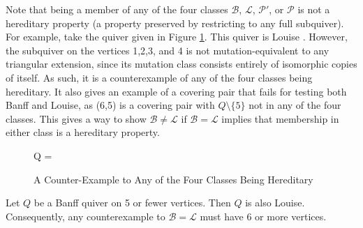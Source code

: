 \documentclass[ALCO,Unicode]{cedram}
\newcommand{\BB}{\mathcal{B}}
\newcommand{\PP}{\mathcal{P}}
\newcommand{\LL}{\mathcal{L}}
\begin{document}
\begin{rema}
Note that being a member of any of the four classes $\BB$, $\LL$, $\PP'$, or $\PP$ is not a hereditary property (a property preserved by restricting to any full subquiver).
For example, take the quiver given in Figure \ref{fig-counter-example}.
This quiver is Louise \cite[Remark 11.15]{MR2995670}.
However, the subquiver on the vertices 1,2,3, and 4 is not mutation-equivalent to any triangular extension, since its mutation class consists entirely of isomorphic copies of itself.
As such, it is a counterexample of any of the four classes being hereditary.  
It also gives an example of a covering pair that fails for testing both Banff and Louise, as (6,5) is a covering pair with $Q \setminus \{5\}$ not in any of the four classes.
This gives a way to show $\BB \neq \LL$ if $\BB = \LL$ implies that membership in either class is a hereditary property.

\begin{figure}[ht]
    \centering
    Q =
    \caption{A Counter-Example to Any of the Four Classes Being Hereditary}
    \label{fig-counter-example}
\end{figure}
\end{rema}

\begin{prop}\label{prop-size-counterexample}
Let $Q$ be a Banff quiver on 5 or fewer vertices.
Then $Q$ is also Louise.
Consequently, any counterexample to $\BB = \LL$ must have 6 or more vertices.
\end{prop}
\end{document}
